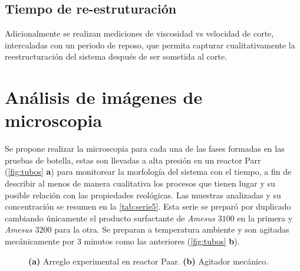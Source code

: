 \subsection*{Tiempo de re-estruturación}
Adicionalmente se realizan mediciones de viscosidad vs velocidad de corte, intercaladas con un periodo de reposo, que permita capturar cualitativamente la reestructuración del sistema después de ser sometida al corte.

\section{Análisis de imágenes de microscopia}
Se propone realizar la microscopia para cada una de las fases formadas en las pruebas de botella, estas son llevadas a alta presión en un reactor Parr (\autoref{fig:tubos} \textbf{a}) para monitorear la morfología del sistema con el tiempo, a fin de describir al menos de manera cualitativa los procesos que tienen lugar y su posible relación con las propiedades reológicas. Las muestras analizadas y su concentración se resumen en la \autoref{tab:serie5}. Esta serie se preparó por duplicado cambiando únicamente el producto surfactante de \emph{Amesus $3100$} en la primera y \emph{Amesus $3200$} para la otra. Se preparan a temperatura ambiente y son agitadas mecánicamente por $3$ minutos como las anteriores (\autoref{fig:tubos} \textbf{b}).

\begin{figure}
    \centering 
    \caption[Muestras en tubos]{\textbf{(a)} Arreglo experimental en reactor Paar. \textbf{(b)} Agitador mecánico. }
    \label{fig:tubos}
\end{figure}

